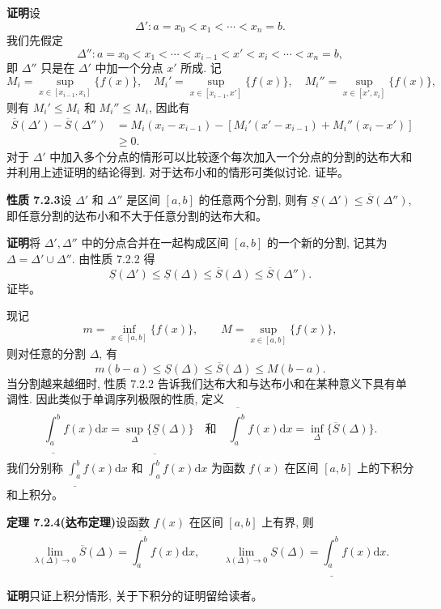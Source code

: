 \documentclass[UTF8,12pt,a4paper,fontset=fandol]{ctexart}
\begin{document}
\noindent\textbf{证明}\quad 设
\[
  \Delta':a=x_0<x_1<\cdots<x_n=b.
\]
我们先假定
\[
  \Delta'':a=x_0<x_1<\cdots<x_{i-1}<x'<x_i<\cdots<x_n=b,
\]
即 $\Delta''$ 只是在 $\Delta'$ 中加一个分点 $x'$ 所成. 记
\[
  M_i=\sup_{x\in[x_{i-1},x_i]}\{f(x)\},\quad
  M_i'=\sup_{x\in[x_{i-1},x']}\{f(x)\},\quad
  M_i''=\sup_{x\in[x',x_i]}\{f(x)\},
\]
则有 $M_i'\leq M_i$ 和 $M_i''\leq M_i$, 因此有
\[
\begin{aligned}
  \overline S(\Delta')-\overline S(\Delta'')
  &=M_i(x_i-x_{i-1})-[M_i'(x'-x_{i-1})+M_i''(x_i-x')]\\
  &\geq0.
\end{aligned}
\]
对于 $\Delta'$ 中加入多个分点的情形可以比较逐个每次加入一个分点的分割的达布大和并利用上述证明的结论得到. 对于达布小和的情形可类似讨论. 证毕。

\noindent\textbf{性质 7.2.3}\quad 设 $\Delta'$ 和 $\Delta''$ 是区间 $[a,b]$ 的任意两个分割, 则有 $\underline S(\Delta')\leq\overline S(\Delta'')$, 即任意分割的达布小和不大于任意分割的达布大和。

\noindent\textbf{证明}\quad 将 $\Delta',\Delta''$ 中的分点合并在一起构成区间 $[a,b]$ 的一个新的分割, 记其为 $\Delta=\Delta'\cup\Delta''$. 由性质 7.2.2 得
\[
  \underline S(\Delta')\leq \underline S(\Delta)\leq \overline S(\Delta)\leq \overline S(\Delta'').
\]
证毕。

现记
\[
  m=\inf_{x\in[a,b]}\{f(x)\},\qquad M=\sup_{x\in[a,b]}\{f(x)\},
\]
则对任意的分割 $\Delta$, 有
\[
  m(b-a)\leq \underline S(\Delta)\leq \overline S(\Delta)\leq M(b-a).
\]
当分割越来越细时, 性质 7.2.2 告诉我们达布大和与达布小和在某种意义下具有单调性. 因此类似于单调序列极限的性质, 定义
\[
  \underline{\int_a^b} f(x)\mathrm dx=\sup_\Delta\{\underline S(\Delta)\}
  \quad\text{和}\quad
  \overline{\int_a^b} f(x)\mathrm dx=\inf_\Delta\{\overline S(\Delta)\}.
\]
我们分别称 $\underline{\int_a^b} f(x)\mathrm dx$ 和 $\overline{\int_a^b} f(x)\mathrm dx$ 为函数 $f(x)$ 在区间 $[a,b]$ 上的下积分和上积分。

\noindent\textbf{定理 7.2.4(达布定理)}\quad 设函数 $f(x)$ 在区间 $[a,b]$ 上有界, 则
\[
  \lim_{\lambda(\Delta)\to0}\overline S(\Delta)=\overline{\int_a^b} f(x)\mathrm dx,\qquad
  \lim_{\lambda(\Delta)\to0}\underline S(\Delta)=\underline{\int_a^b} f(x)\mathrm dx.
\]

\noindent\textbf{证明}\quad 只证上积分情形, 关于下积分的证明留给读者。
\end{document}
